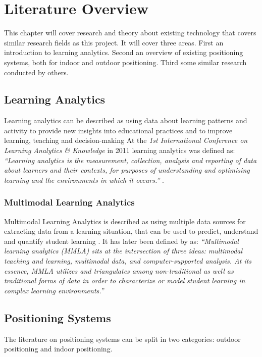 \documentclass[../Main/thesis.tex]{subfiles}
\begin{document}
\chapter{Literature Overview}
\label{ch:literature_overview}
This chapter will cover research and theory about existing technology that covers similar research fields as this project. 
It will cover three areas.
First an introduction to learning analytics.
Second an overview of existing positioning systems, both for indoor and outdoor positioning.
Third some similar research conducted by others.

\section{Learning Analytics} 
Learning analytics can be described as using data about learning patterns and activity to provide new insights into educational practices and to improve learning, teaching and decision-making \citep{Siemens2012a}
At the \textit{1st International Conference on Learning Analytics \& Knowledge} in 2011 learning analytics was defined as: \textit{``Learning analytics is the measurement, collection, analysis and reporting of data about learners and their contexts, for purposes of understanding and optimising learning and the environments in which it occurs.''} \citep{BuckinghamShum2012}.


\subsection*{Multimodal Learning Analytics}
Multimodal Learning Analytics is described as using multiple data sources for extracting data from a learning situation, that can be used to predict, understand and quantify student learning \citep{Worsley2010}.
It has later been defined by \citet{Worsley2016} as: \textit{``Multimodal learning analytics (MMLA) sits at the intersection of three ideas: multimodal teaching and learning, multimodal data, and computer-supported analysis. At its essence, MMLA utilizes and triangulates among non-traditional as well as traditional forms of data in order to characterize or model student learning in complex learning environments.''}

\section{Positioning Systems}
The literature on positioning systems can be split in two categories: outdoor positioning and indoor positioning.
\end{document}
